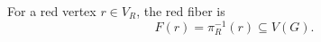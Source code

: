 \begin{definition}
For a red vertex \(r\in V_R\), the red fiber is
\[
F(r)=\pi_R^{-1}(r)\subseteq V(G).
\]
\end{definition}
